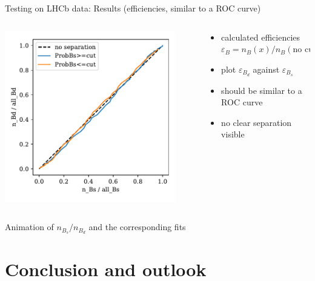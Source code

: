 \documentclass[aspectratio=1610, 10pt]{beamer}
\begin{document}
\begin{frame}{Testing on LHCb data: Results (efficiencies, similar to a ROC curve)}
  \begin{columns}
    \begin{column}{0.5\textwidth}
      \centering
      \includegraphics[width=0.9\textwidth]{images/data_roc.pdf}
    \end{column}
    \begin{column}{0.5\textwidth}
      \begin{itemize}
        \item calculated efficiencies $\varepsilon_B = n_B(x)/n_B(\text{no cut})$
        \item plot $\varepsilon_{B_d}$ against $\varepsilon_{B_s}$
        \item should be similar to a ROC curve
        \item no clear separation visible
      \end{itemize}
    \end{column}
  \end{columns}
\end{frame}

\begin{frame}{Animation of $n_{B_s}/n_{B_d}$ and the corresponding fits}
\end{frame}

\section*{Conclusion and outlook}
\end{document}
